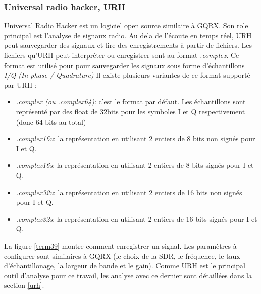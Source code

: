 \subsubsection{Universal radio hacker, URH}

Universal Radio Hacker est un logiciel open source similaire à GQRX. Son role principal est l'analyse de signaux radio. Au dela de l'écoute en temps réel, URH peut sauvegarder des signaux et lire des enregistrements à partir de fichiers. Les fichiers qu'URH peut interpréter ou enregistrer sont au format \textit{.complex}. Ce format est utilisé pour pour sauvegarder les signaux sous forme d'échantillons \textit{I/Q (In phase / Quadrature)} Il existe plusieurs variantes de ce format supporté par URH :

\vspace{0.1cm}

\begin{itemize}
\item \textit{.complex (ou .complex64)}: c'est le format par défaut. Les échantillons sont représenté par des float de 32bits pour les symboles I et Q respectivement (donc 64 bits au total)
 
\item  \textit{.complex16u}: la représentation en utilisant 2  entiers de 8 bits non signés pour I et Q.

\item  \textit{.complex16s}: la représentation en utilisant 2  entiers de 8 bits signés pour I et Q.

\item  \textit{.complex32u}: la représentation en utilisant 2  entiers de 16 bits non signés pour I et Q. 

\item  \textit{.complex32s}: la représentation en utilisant 2 entiers de 16 bits signés pour I et Q.
\end{itemize}

\vspace{0.1cm}

La figure \ref{term39} montre comment enregistrer un signal. Les paramètres à configurer sont similaires à GQRX (le choix de la SDR, le fréquence, le taux d'échantillonage, la largeur de bande et le gain). Comme URH est le principal outil d'analyse pour ce travail, les analyse avec ce dernier sont détaillées dans la section \ref{urh}.

